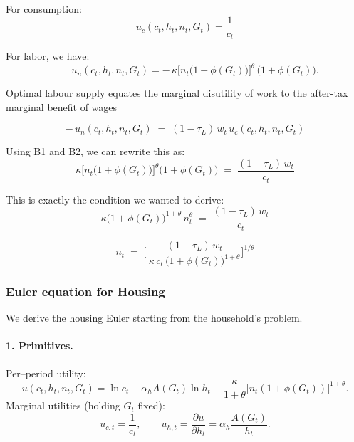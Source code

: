 For consumption:
\begin{equation*}
    u_c(c_t,h_t,n_t,G_t)=\frac{1}{c_t} \tag{B1}
\end{equation*}

For labor, we have:
\begin{equation*}
\qquad
u_n(c_t,h_t,n_t,G_t)=-\,\kappa\bigl[n_t\bigl(1+\phi(G_t)\bigr)\bigr]^{\theta}\,\bigl(1+\phi(G_t)\bigr). \tag{B2}
\end{equation*}

Optimal labour supply equates the marginal disutility of work to the after-tax marginal benefit of wages

\begin{equation*}
-\,u_n(c_t,h_t,n_t,G_t) \;=\;(1-\tau_L)\,w_t\,u_c(c_t,h_t,n_t,G_t) 
\end{equation*}

Using B1 and B2, we can rewrite this as:
\begin{equation*}
\kappa\bigl[n_t\bigl(1+\phi(G_t)\bigr)\bigr]^{\theta}\bigl(1+\phi(G_t)\bigr)
    \;=\;\frac{(1-\tau_L)\,w_t}{c_t}
\end{equation*}

This is exactly the condition we wanted to derive:
\begin{equation*}
\kappa\bigl(1+\phi(G_t)\bigr)^{1+\theta}\,n_t^{\theta}
      \;=\;\frac{(1-\tau_L)\,w_t}{c_t} 
\end{equation*}

\begin{equation*}
        n_t \;=\;\Biggl[\,
        \frac{(1-\tau_L)\,w_t}
            {\kappa\,c_t\,\bigl(1+\phi(G_t)\bigr)^{1+\theta}}
        \Biggr]^{\!1/\theta}\!
\end{equation*}

\subsubsection{Euler equation for Housing}

We derive the housing Euler starting from the household’s problem.

\paragraph{1. Primitives.}
Per–period utility:
\[
u(c_t,h_t,n_t,G_t)=\ln c_t + \alpha_h A(G_t)\ln h_t - \frac{\kappa}{1+\theta}\bigl[n_t(1+\phi(G_t))\bigr]^{1+\theta}.
\]
Marginal utilities (holding $G_t$ fixed):
\[
u_{c,t}=\frac{1}{c_t},\qquad
u_{h,t}=\frac{\partial u}{\partial h_t}=\alpha_h \frac{A(G_t)}{h_t}.
\]

